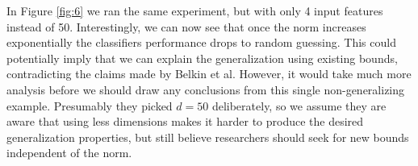 In Figure \ref{fig:6} we ran the same experiment, but with only 4 input features instead of 50. Interestingly, we can now see that once the norm increases exponentially the classifiers performance drops to random guessing. This could potentially imply that we can explain the generalization using existing bounds, contradicting the claims made by Belkin et al. However, it would take much more analysis before we should draw any conclusions from this single non-generalizing example. Presumably they picked $d=50$ deliberately, so we assume they are aware that using less dimensions makes it harder to produce the desired generalization properties, but still believe researchers should seek for new bounds independent of the norm.
